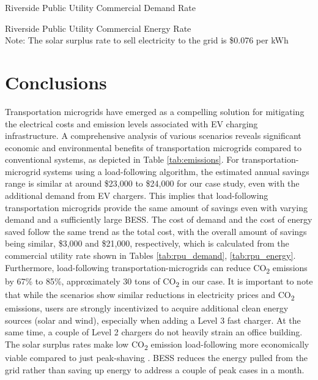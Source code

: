 \documentclass[conference,  usletter]{IEEEtran}
\begin{document}
%		
%		
\begin{table}[t]
\caption{Riverside Public Utility Commercial Demand Rate \cite{rpu_rate}}
\centering

\normalsize
\label{tab:rpu_demand}
\end{table}	
\begin{table}[t]
\caption{Riverside Public Utility Commercial Energy Rate \cite{rpu_rate} \\ Note: The solar surplus rate to sell electricity to the grid is \$0.076 per kWh \cite{rpu_nem}}
\centering

\normalsize
\label{tab:rpu_energy}
\end{table}	
\section{Conclusions}
Transportation microgrids have emerged as a compelling solution for mitigating the electrical costs and emission levels associated with EV charging infrastructure. A comprehensive analysis of various scenarios reveals significant economic and environmental benefits of transportation microgrids compared to conventional systems, as depicted in  Table \ref{tab:emissions}. For transportation-microgrid systems using a load-following algorithm, the estimated annual savings range is similar at around \$23,000 to \$24,000 for our case study, even with the additional demand from EV chargers. This implies that load-following transportation microgrids provide the same amount of savings even with varying demand and a sufficiently large BESS. The cost of demand and the cost of energy saved follow the same trend as the total cost, with the overall amount of savings being similar, \$3,000 and \$21,000, respectively, which is calculated from the commercial utility rate shown in Tables \ref{tab:rpu_demand}, \ref{tab:rpu_energy}.
Furthermore, load-following transportation-microgrids can reduce CO\textsubscript{2} emissions by 67\% to 85\%, approximately 30 tons of CO\textsubscript{2} in our case. It is important to note that while the scenarios show similar reductions in electricity prices and CO\textsubscript{2} emissions, users are strongly incentivized to acquire additional clean energy sources (solar and wind), especially when adding a Level 3 fast charger. At the same time, a couple of Level 2 chargers do not heavily strain an office building. The solar surplus rates make low CO\textsubscript{2} emission load-following more economically viable compared to just peak-shaving \cite{rpu_nem}. BESS reduces the energy pulled from the grid rather than saving up energy to address a couple of peak cases in a month.
\end{document}
